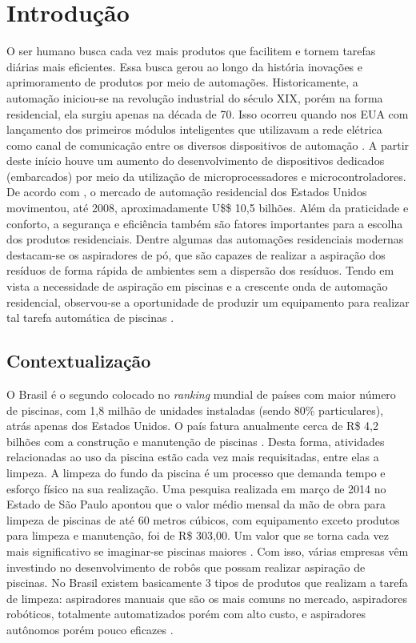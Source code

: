 \chapter{Introdução}
O ser humano busca cada vez mais produtos que facilitem e tornem tarefas 
diárias mais eficientes. Essa busca gerou ao longo da história inovações e 
aprimoramento de produtos por meio de automações. Historicamente, a automação 
iniciou-se na revolução industrial do século XIX, porém na forma residencial, 
ela surgiu apenas na década de 70. Isso ocorreu quando nos EUA com lançamento dos primeiros 
módulos inteligentes que utilizavam a rede elétrica como canal de comunicação 
entre os diversos dispositivos de automação \cite{bortoluzzi2013}. A partir deste início 
houve um aumento do desenvolvimento de dispositivos dedicados (embarcados) por 
meio da utilização de microprocessadores e microcontroladores. De acordo com 
, o mercado de automação residencial dos Estados Unidos 
movimentou, até 2008, aproximadamente U\$\$ 10,5 bilhões. Além da praticidade 
e conforto, a segurança e eficiência também são fatores importantes para a 
escolha dos produtos residenciais. Dentre algumas das automações residenciais 
modernas destacam-se os aspiradores de pó, que são capazes de realizar a 
aspiração dos resíduos de forma rápida de ambientes sem a dispersão dos 
resíduos. Tendo em vista a necessidade de aspiração em piscinas e a crescente 
onda de automação residencial, observou-se a oportunidade de produzir um 
equipamento para realizar tal tarefa automática de piscinas \cite{kanno2014}.

\section{Contextualização}
O Brasil é o segundo colocado no \textit{ranking} mundial de países com maior número de 
piscinas, com 1,8 milhão de unidades instaladas (sendo 80\% particulares), 
atrás apenas dos Estados Unidos. O país fatura anualmente cerca de R\$ 4,2 
bilhões com a construção e manutenção de piscinas \cite{portalfatorbrasil2013}. Desta 
forma, atividades relacionadas ao uso da piscina estão cada vez mais 
requisitadas, entre elas a limpeza. A limpeza do fundo da piscina é um processo
que demanda tempo e esforço físico na sua realização. Uma pesquisa realizada 
em  março de 2014 no Estado de São Paulo apontou que o valor médio mensal da 
mão de obra para limpeza de piscinas de até 60 metros cúbicos, com equipamento exceto 
produtos para limpeza e manutenção,  foi de R\$ 303,00. Um valor que se torna 
cada vez mais significativo se imaginar-se piscinas maiores \cite{datafolha2014}. 
Com isso, várias empresas vêm investindo no desenvolvimento de robôs que possam
realizar aspiração de piscinas. No Brasil existem basicamente 3 tipos de 
produtos que realizam a tarefa de limpeza: aspiradores manuais que são os mais 
comuns no mercado, aspiradores robóticos, totalmente automatizados porém com 
alto custo, e aspiradores autônomos porém pouco eficazes \cite{miura2006}.

